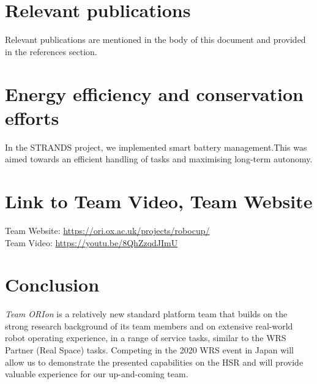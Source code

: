\documentclass[runningheads,a4paper]{llncs}
\newcommand{\teamori}{Team ORIon}
\begin{document}
\section{Relevant publications }
Relevant publications are mentioned in the body of this document and provided in the references section.

\section{Energy efficiency and conservation efforts}
In the STRANDS project, we implemented smart battery management.This was aimed towards an efficient handling of tasks and maximising long-term autonomy.

\section{Link to Team Video, Team Website}
Team Website: \url{https://ori.ox.ac.uk/projects/robocup/} \\
Team Video: \url{https://youtu.be/8QhZzqdJImU} 


\section{Conclusion}
\textit{\teamori{}} is a relatively new standard platform team that builds on the strong research 
background of its team members and on extensive real-world robot operating
experience, in a range of service tasks, similar to the WRS Partner (Real Space) tasks. Competing in the 2020 WRS event in Japan will allow us to demonstrate 
the presented capabilities on the HSR and will provide valuable experience
for our up-and-coming team.



\end{document}
